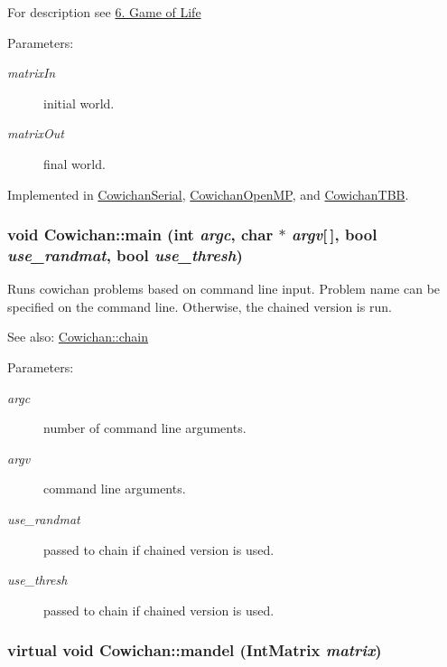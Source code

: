 For description see \hyperlink{index_life_sec}{6. Game of Life} \begin{Desc}
\item[Parameters:]
\begin{description}
\item[{\em matrixIn}]initial world. \item[{\em matrixOut}]final world. \end{description}
\end{Desc}


Implemented in \hyperlink{class_cowichan_serial_ffd5b022c1d24226e11924094d8af349}{CowichanSerial}, \hyperlink{class_cowichan_open_m_p_d24f3ef01289b8f1bd7b864f585daa62}{CowichanOpenMP}, and \hyperlink{class_cowichan_t_b_b_273e3e8a2e05108f59ec613472bfa363}{CowichanTBB}.\hypertarget{class_cowichan_905f3eb45f21cdaa1c32a421d001fa4c}{
\subsubsection[{main}]{\setlength{\rightskip}{0pt plus 5cm}void Cowichan::main (int {\em argc}, \/  char $\ast$ {\em argv}\mbox{[}$\,$\mbox{]}, \/  bool {\em use\_\-randmat}, \/  bool {\em use\_\-thresh})}}
\label{class_cowichan_905f3eb45f21cdaa1c32a421d001fa4c}


Runs cowichan problems based on command line input. Problem name can be specified on the command line. Otherwise, the chained version is run. \begin{Desc}
\item[See also:]\hyperlink{class_cowichan_08ee88eb612571e8faa20b2645dc906d}{Cowichan::chain} \end{Desc}
\begin{Desc}
\item[Parameters:]
\begin{description}
\item[{\em argc}]number of command line arguments. \item[{\em argv}]command line arguments. \item[{\em use\_\-randmat}]passed to chain if chained version is used. \item[{\em use\_\-thresh}]passed to chain if chained version is used. \end{description}
\end{Desc}
\hypertarget{class_cowichan_ec6cc4eb2ad444474b923532167e98a2}{
\subsubsection[{mandel}]{\setlength{\rightskip}{0pt plus 5cm}virtual void Cowichan::mandel ({\bf IntMatrix} {\em matrix})}}
\label{class_cowichan_ec6cc4eb2ad444474b923532167e98a2}


